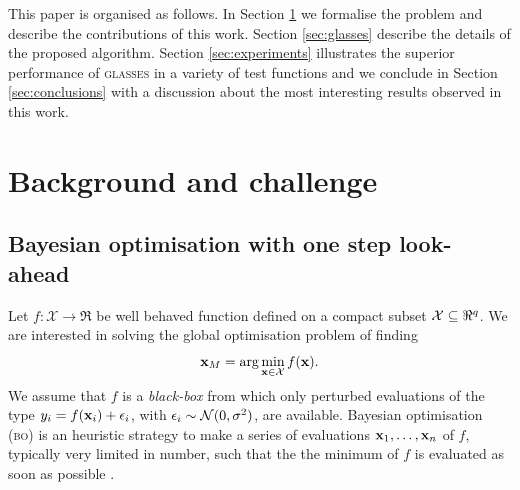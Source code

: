 \documentclass[twoside]{article}
\newcommand{\acr}[1]{\textsc{#1}\xspace}
\newcommand{\us}{\acr{glasses}}
\newcommand{\bo}{\acr{bo}}
\begin{document}

This paper is organised as follows. In Section \ref{sec:background} we formalise the problem and describe the contributions of this work. Section \ref{sec:glasses} describe the details of the proposed algorithm. Section \ref{sec:experiments} illustrates the superior performance of \us in a variety of test functions and we conclude in Section \ref{sec:conclusions} with a discussion about the most interesting results observed in this work.


\section{Background and challenge}\label{sec:background}
\subsection{Bayesian optimisation with one step look-ahead} %
\label{sec:bayesian_optimisation}



Let $f: {\mathcal X} \to \Re$ be well behaved function defined on a compact subset ${\mathcal X} \subseteq \Re^{q}$. We are interested in solving the global optimisation problem of finding 
$$\mathbf{x}_{M} = \arg \min_{\mathbf{x} \in {\mathcal X}} f(\mathbf{x}).$$ 
We assume that $f$ is a \emph{black-box} from which only perturbed evaluations of the type $y_i = f(\mathbf{x}_i) + \epsilon_i$, with $\epsilon_i \sim\mathcal{N}(0,\sigma^2)$, are  available. Bayesian optimisation (\bo) is an heuristic strategy to make a series of evaluations $\mathbf{x}_1,\dots,\mathbf{x}_n$ of $f$, typically very limited in number,  such that the the minimum of $f$ is evaluated as soon as possible \citep{Lizotte_2008,Jones_2001,Snoek*Larochelle*Adams_2012,Brochu*Cora*DeFreitas_2010}.
\end{document}
